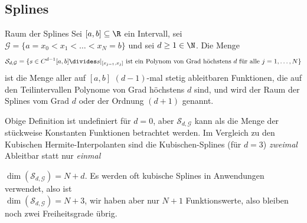 
\newsectionNoPB
\subsection{Splines}
\begin{definition}[]{Raum der Splines}
    Sei $[a, b] \subseteq \R$ ein Intervall, sei $\mathcal{G} = \{ a = x_0 < x_1 < \ldots < x_N = b \}$ und sei $d \geq 1 \in \N$.
    Die Menge
    \begin{align*}
        \mathcal{S}_{d, \mathcal{G}} = \{ s \in C^{d - 1}[a, b] \divides s|_{[x_{j - 1}, x_j]} \text{ ist ein Polynom von Grad höchstens } d \text{ für alle }j=1,\ldots,N \}
    \end{align*}
    ist die Menge aller auf $[a, b]$ $(d - 1)$-mal stetig ableitbaren Funktionen, die auf den Teilintervallen Polynome von Grad höchstens $d$ sind,
    und wird der Raum der Splines vom Grad $d$ oder der Ordnung $(d + 1)$ genannt.
\end{definition}

\inlineremark Obige Definition ist undefiniert für $d = 0$, aber $\mathcal{S}_{d, \mathcal{G}}$ kann als die Menge der stückweise Konstanten Funktionen betrachtet werden.
Im Vergleich zu den Kubischen Hermite-Interpolanten sind die Kubischen-Splines (für $d = 3$) \textit{zweimal} Ableitbar statt nur \textit{einmal}

\inlineremark $\dim(\mathcal{S}_{d, \mathcal{G}}) = N + d$. Es werden oft kubische Splines in Anwendungen verwendet, also ist\\
$\dim(\mathcal{S}_{d, \mathcal{G}}) = N + 3$, wir haben aber nur $N + 1$ Funktionswerte, also bleiben noch zwei Freiheitsgrade übrig.

